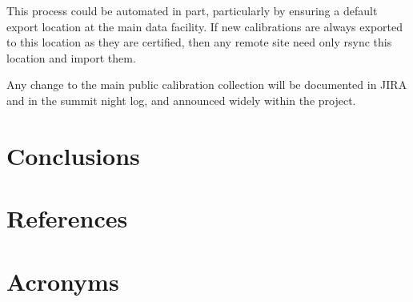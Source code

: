 \documentclass[DM,authoryear,toc]{lsstdoc}
\begin{document}
This process could be automated in part, particularly by ensuring a default export location at the main data facility.  If new calibrations are always exported to this location as they are certified, then any remote site need only rsync this location and import them.

Any change to the main public calibration collection will be documented in JIRA and in the summit night log, and announced widely within the project.

\section{Conclusions}

\appendix
\section{References} \label{sec:bib}
\renewcommand{\refname}{} %


\section{Acronyms} \label{sec:acronyms}

\end{document}
